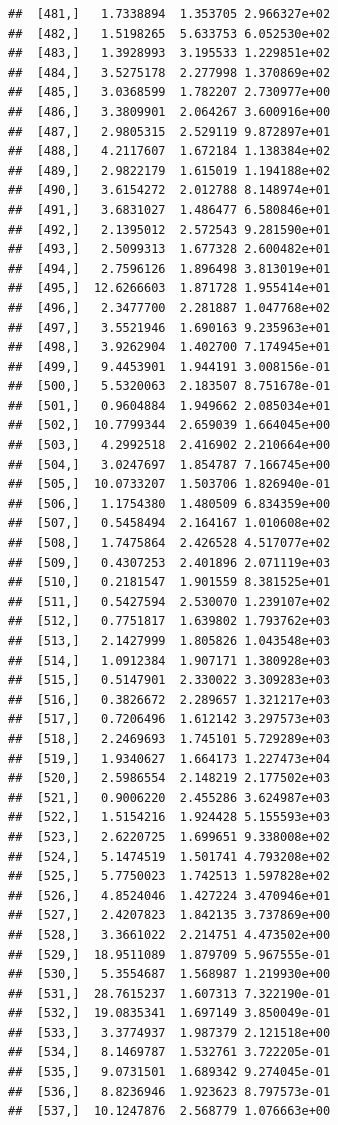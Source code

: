 \documentclass[article]{jss}\usepackage[]{graphicx}\usepackage[]{xcolor}
\makeatletter
\newenvironment{kframe}{%
 \def\at@end@of@kframe{}%
 \ifinner\ifhmode%
  \def\at@end@of@kframe{\end{minipage}}%
  \begin{minipage}{\columnwidth}%
 \fi\fi%
 \def\FrameCommand##1{\hskip\@totalleftmargin \hskip-\fboxsep
 \colorbox{shadecolor}{##1}\hskip-\fboxsep
     \hskip-\linewidth \hskip-\@totalleftmargin \hskip\columnwidth}%
 \MakeFramed {\advance\hsize-\width
   \@totalleftmargin\z@ \linewidth\hsize
   \@setminipage}}%
 {\par\unskip\endMakeFramed%
 \at@end@of@kframe}
\newenvironment{knitrout}{}{} %
\makeatother
\begin{document}
\begin{knitrout}
\begin{kframe}
\begin{verbatim}
##  [481,]   1.7338894  1.353705 2.966327e+02
##  [482,]   1.5198265  5.633753 6.052530e+02
##  [483,]   1.3928993  3.195533 1.229851e+02
##  [484,]   3.5275178  2.277998 1.370869e+02
##  [485,]   3.0368599  1.782207 2.730977e+00
##  [486,]   3.3809901  2.064267 3.600916e+00
##  [487,]   2.9805315  2.529119 9.872897e+01
##  [488,]   4.2117607  1.672184 1.138384e+02
##  [489,]   2.9822179  1.615019 1.194188e+02
##  [490,]   3.6154272  2.012788 8.148974e+01
##  [491,]   3.6831027  1.486477 6.580846e+01
##  [492,]   2.1395012  2.572543 9.281590e+01
##  [493,]   2.5099313  1.677328 2.600482e+01
##  [494,]   2.7596126  1.896498 3.813019e+01
##  [495,]  12.6266603  1.871728 1.955414e+01
##  [496,]   2.3477700  2.281887 1.047768e+02
##  [497,]   3.5521946  1.690163 9.235963e+01
##  [498,]   3.9262904  1.402700 7.174945e+01
##  [499,]   9.4453901  1.944191 3.008156e-01
##  [500,]   5.5320063  2.183507 8.751678e-01
##  [501,]   0.9604884  1.949662 2.085034e+01
##  [502,]  10.7799344  2.659039 1.664045e+00
##  [503,]   4.2992518  2.416902 2.210664e+00
##  [504,]   3.0247697  1.854787 7.166745e+00
##  [505,]  10.0733207  1.503706 1.826940e-01
##  [506,]   1.1754380  1.480509 6.834359e+00
##  [507,]   0.5458494  2.164167 1.010608e+02
##  [508,]   1.7475864  2.426528 4.517077e+02
##  [509,]   0.4307253  2.401896 2.071119e+03
##  [510,]   0.2181547  1.901559 8.381525e+01
##  [511,]   0.5427594  2.530070 1.239107e+02
##  [512,]   0.7751817  1.639802 1.793762e+03
##  [513,]   2.1427999  1.805826 1.043548e+03
##  [514,]   1.0912384  1.907171 1.380928e+03
##  [515,]   0.5147901  2.330022 3.309283e+03
##  [516,]   0.3826672  2.289657 1.321217e+03
##  [517,]   0.7206496  1.612142 3.297573e+03
##  [518,]   2.2469693  1.745101 5.729289e+03
##  [519,]   1.9340627  1.664173 1.227473e+04
##  [520,]   2.5986554  2.148219 2.177502e+03
##  [521,]   0.9006220  2.455286 3.624987e+03
##  [522,]   1.5154216  1.924428 5.155593e+03
##  [523,]   2.6220725  1.699651 9.338008e+02
##  [524,]   5.1474519  1.501741 4.793208e+02
##  [525,]   5.7750023  1.742513 1.597828e+02
##  [526,]   4.8524046  1.427224 3.470946e+01
##  [527,]   2.4207823  1.842135 3.737869e+00
##  [528,]   3.3661022  2.214751 4.473502e+00
##  [529,]  18.9511089  1.879709 5.967555e-01
##  [530,]   5.3554687  1.568987 1.219930e+00
##  [531,]  28.7615237  1.607313 7.322190e-01
##  [532,]  19.0835341  1.697149 3.850049e-01
##  [533,]   3.3774937  1.987379 2.121518e+00
##  [534,]   8.1469787  1.532761 3.722205e-01
##  [535,]   9.0731501  1.689342 9.274045e-01
##  [536,]   8.8236946  1.923623 8.797573e-01
##  [537,]  10.1247876  2.568779 1.076663e+00

\end{verbatim}
\end{kframe}
\end{knitrout}
\end{document}

